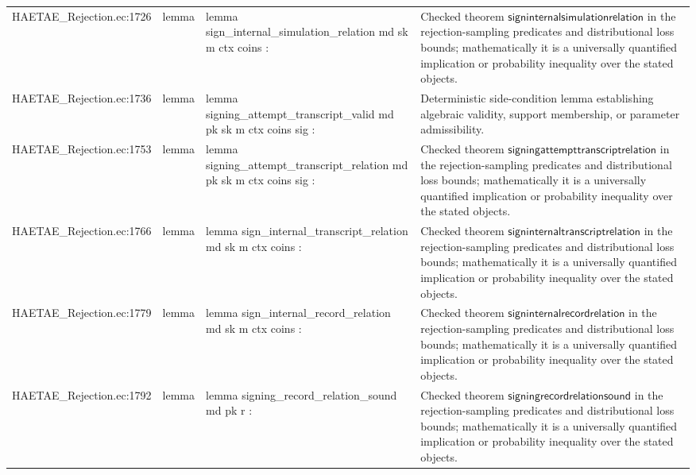 \documentclass[10pt]{article}
\begin{document}
\begin{longtable}{L{0.11\textwidth}L{0.055\textwidth}L{0.385\textwidth}L{0.41\textwidth}}
HAETAE\_\allowbreak{}Rejection.\allowbreak{}ec:\allowbreak{}1726 & lemma & {\ttfamily\scriptsize lemma sign\_\allowbreak{}internal\_\allowbreak{}simulation\_\allowbreak{}relation md sk m ctx coins :} & Checked theorem $\mathsf{signinternalsimulationrelation}$ in the rejection-sampling predicates and distributional loss bounds; mathematically it is a universally quantified implication or probability inequality over the stated objects. \\
HAETAE\_\allowbreak{}Rejection.\allowbreak{}ec:\allowbreak{}1736 & lemma & {\ttfamily\scriptsize lemma signing\_\allowbreak{}attempt\_\allowbreak{}transcript\_\allowbreak{}valid md pk sk m ctx coins sig :} & Deterministic side-condition lemma establishing algebraic validity, support membership, or parameter admissibility. \\
HAETAE\_\allowbreak{}Rejection.\allowbreak{}ec:\allowbreak{}1753 & lemma & {\ttfamily\scriptsize lemma signing\_\allowbreak{}attempt\_\allowbreak{}transcript\_\allowbreak{}relation md pk sk m ctx coins sig :} & Checked theorem $\mathsf{signingattempttranscriptrelation}$ in the rejection-sampling predicates and distributional loss bounds; mathematically it is a universally quantified implication or probability inequality over the stated objects. \\
HAETAE\_\allowbreak{}Rejection.\allowbreak{}ec:\allowbreak{}1766 & lemma & {\ttfamily\scriptsize lemma sign\_\allowbreak{}internal\_\allowbreak{}transcript\_\allowbreak{}relation md sk m ctx coins :} & Checked theorem $\mathsf{signinternaltranscriptrelation}$ in the rejection-sampling predicates and distributional loss bounds; mathematically it is a universally quantified implication or probability inequality over the stated objects. \\
HAETAE\_\allowbreak{}Rejection.\allowbreak{}ec:\allowbreak{}1779 & lemma & {\ttfamily\scriptsize lemma sign\_\allowbreak{}internal\_\allowbreak{}record\_\allowbreak{}relation md sk m ctx coins :} & Checked theorem $\mathsf{signinternalrecordrelation}$ in the rejection-sampling predicates and distributional loss bounds; mathematically it is a universally quantified implication or probability inequality over the stated objects. \\
HAETAE\_\allowbreak{}Rejection.\allowbreak{}ec:\allowbreak{}1792 & lemma & {\ttfamily\scriptsize lemma signing\_\allowbreak{}record\_\allowbreak{}relation\_\allowbreak{}sound md pk r :} & Checked theorem $\mathsf{signingrecordrelationsound}$ in the rejection-sampling predicates and distributional loss bounds; mathematically it is a universally quantified implication or probability inequality over the stated objects. \\

\end{longtable}
\end{document}
